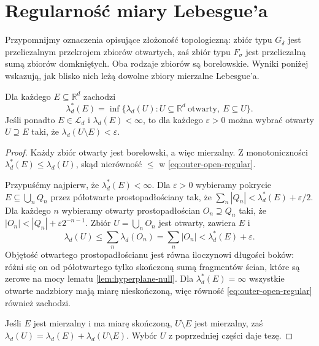 \section{Regularność miary Lebesgue'a}

Przypomnijmy oznaczenia opisujące złożoność topologiczną:
zbiór typu $G_\delta$ jest przeliczalnym przekrojem zbiorów
otwartych, zaś zbiór typu $F_\sigma$ jest przeliczalną
sumą zbiorów domkniętych. Oba rodzaje zbiorów są borelowskie.
Wyniki poniżej wskazują, jak blisko nich leżą dowolne
zbiory mierzalne Lebesgue'a.

\begin{twierdzenie}
\label{thm:lebesgue-outer-regular}
Dla każdego $E\subseteq\mathbb R^d$ zachodzi
\begin{equation}\label{eq:outer-open-regular}
\lambda_d^*(E)=\inf\{\lambda_d(U):
U\subseteq\mathbb R^d\ \text{otwarty},\ E\subseteq U\}.
\end{equation}
Jeśli ponadto $E\in\mathcal L_d$ i
$\lambda_d(E)<\infty$, to dla każdego
$\varepsilon>0$ można wybrać otwarty $U\supseteq E$
taki, że $\lambda_d(U\setminus E)<\varepsilon$.
\end{twierdzenie}

\begin{proof}
Każdy zbiór otwarty jest borelowski, a więc
mierzalny. Z monotoniczności
$\lambda_d^*(E)\le\lambda_d(U)$, skąd nierówność
$\le$ w \eqref{eq:outer-open-regular}.

Przypuśćmy najpierw, że $\lambda_d^*(E)<\infty$.
Dla $\varepsilon>0$ wybieramy pokrycie
$E\subseteq\bigcup_nQ_n$ przez półotwarte
prostopadłościany tak, że
$\sum_n|Q_n|<\lambda_d^*(E)+\varepsilon/2$.
Dla każdego $n$ wybieramy otwarty prostopadłościan
$O_n\supseteq Q_n$ taki, że
$|O_n|<|Q_n|+\varepsilon2^{-n-1}$.
Zbiór $U=\bigcup_nO_n$ jest otwarty, zawiera $E$ i
\[
\lambda_d(U)\le\sum_n\lambda_d(O_n)
=\sum_n|O_n|<\lambda_d^*(E)+\varepsilon.
\]
Objętość otwartego prostopadłościanu jest równa
iloczynowi długości boków: różni się on od
półotwartego tylko skończoną sumą fragmentów ścian,
które są zerowe na mocy lematu \ref{lem:hyperplane-null}.
Dla $\lambda_d^*(E)=\infty$ wszystkie otwarte
nadzbiory mają miarę nieskończoną, więc równość
\eqref{eq:outer-open-regular} również zachodzi.

Jeśli $E$ jest mierzalny i ma miarę skończoną,
$U\setminus E$ jest mierzalny, zaś
$\lambda_d(U)=\lambda_d(E)+\lambda_d(U\setminus E)$.
Wybór $U$ z poprzedniej części daje tezę.
\end{proof}


